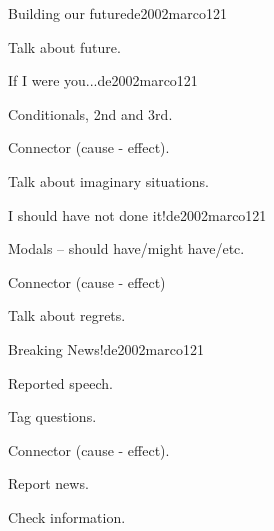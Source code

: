 \begin{syllabus}
\begin{unit}{Building our future}{}{de2002marco}{12}{1}
   \begin{learningoutcomes}
      \item Talk about future.
   \end{learningoutcomes}

\end{unit}

\begin{unit}{If I were you...}{}{de2002marco}{12}{1}
   \begin{topics}
      \item Conditionals, 2nd and 3rd.
      \item Connector (cause - effect).
   \end{topics}

   \begin{learningoutcomes}
      \item Talk about imaginary situations. 
   \end{learningoutcomes}

\end{unit}

\begin{unit}{I should have not done it!}{}{de2002marco}{12}{1}
   \begin{topics}
      \item Modals – should have/might have/etc.
      \item Connector (cause - effect)
   \end{topics}

   \begin{learningoutcomes}
      \item Talk about regrets.
   \end{learningoutcomes}

\end{unit}

\begin{unit}{Breaking News!}{}{de2002marco}{12}{1}
   \begin{topics}
      \item Reported speech.
      \item Tag questions.
      \item Connector (cause - effect).
   \end{topics}

   \begin{learningoutcomes}
      \item Report news.
      \item Check information.
   \end{learningoutcomes}


\end{unit}
\end{syllabus}
